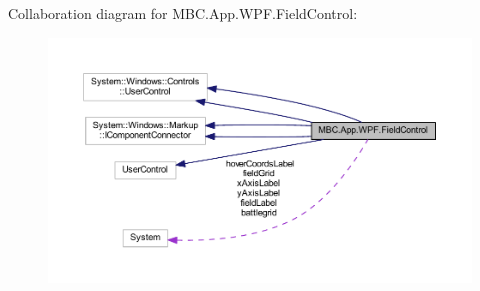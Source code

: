 Collaboration diagram for M\-B\-C.\-App.\-W\-P\-F.\-Field\-Control\-:
\nopagebreak
\begin{figure}[H]
\begin{center}
\leavevmode
\includegraphics[width=350pt]{class_m_b_c_1_1_app_1_1_w_p_f_1_1_field_control__coll__graph}
\end{center}
\end{figure}
